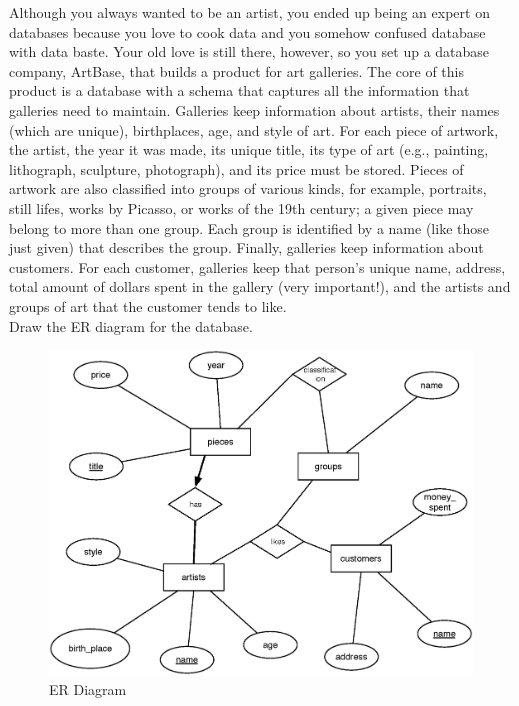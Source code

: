 \begin{problem}{2.8}

  Although you always wanted to be an artist, you ended up being an expert on databases because you love to cook data
  and you somehow confused database with data baste. Your old love is still there, however, so you set up a database
  company, ArtBase, that builds a product for art galleries. The core of this product is a database with a schema that
  captures all the information that galleries need to maintain. Galleries keep information about artists, their names
  (which are unique), birthplaces, age, and style of art. For each piece of artwork, the artist, the year it was made,
  its unique title, its type of art (e.g., painting, lithograph, sculpture, photograph), and its price must be stored.
  Pieces of artwork are also classified into groups of various kinds, for example, portraits, still lifes, works by
  Picasso, or works of the 19th century; a given piece may belong to more than one group. Each group is identified by a
  name (like those just given) that describes the group. Finally, galleries keep information about customers. For each
  customer, galleries keep that person's unique name, address, total amount of dollars spent in the gallery (very
  important!), and the artists and groups of art that the customer tends to like. \\

  \noindent Draw the ER diagram for the database.

  \begin{solution}
    \begin{figure}[H]
      \centering
      \caption { ER Diagram }
      \includegraphics[scale=.5]{2_8.eps}
    \end{figure}
  \end{solution}
\end{problem}



